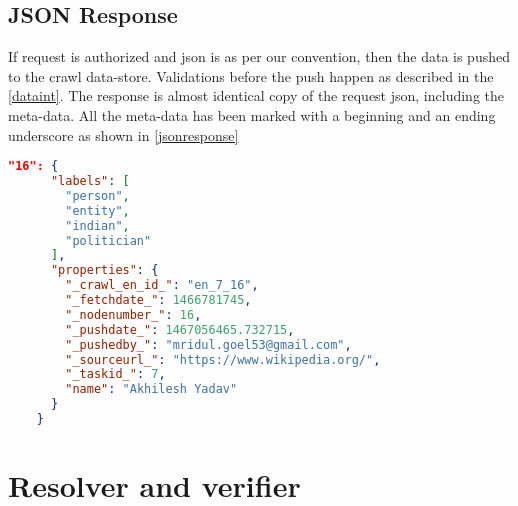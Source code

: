 \subsection{JSON Response}
If request is authorized and json is as per our convention, then the data is pushed to the crawl data-store. Validations before the push happen as described in the \ref{dataint}. The response is almost identical copy of the request json, including the meta-data. All the meta-data has been marked with a beginning and an ending underscore as shown in \ref{jsonresponse} \\


\label{jsonresponse}
\begin{lstlisting}[language=json,firstnumber=1]
"16": {
      "labels": [
        "person",
        "entity",
        "indian",
        "politician"
      ],
      "properties": {
        "_crawl_en_id_": "en_7_16",
        "_fetchdate_": 1466781745,
        "_nodenumber_": 16,
        "_pushdate_": 1467056465.732715,
        "_pushedby_": "mridul.goel53@gmail.com",
        "_sourceurl_": "https://www.wikipedia.org/",
        "_taskid_": 7,
        "name": "Akhilesh Yadav"
      }
    }
\end{lstlisting}


\section{Resolver and verifier}

